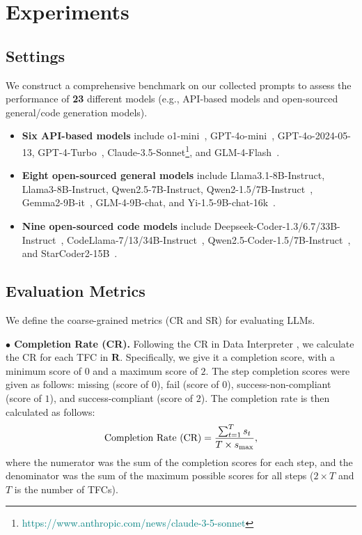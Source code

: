 \section{Experiments}
\label{sec: experiments}

\subsection{Settings}
We construct a comprehensive benchmark on our collected prompts to assess the performance of \textbf{23} different models (e.g., API-based models and open-sourced general/code generation models). 

\begin{itemize}[leftmargin=*,itemsep=0pt,parsep=0.5em,topsep=0.3em,partopsep=0.3em]
    \item \textbf{Six API-based models} include o1-mini~\citep{jaech2024openai}, GPT-4o-mini~\cite{hurst2024gpt4o}, GPT-4o-2024-05-13, GPT-4-Turbo~\citep{achiam2023gpt}, Claude-3.5-Sonnet\footnote{\textcolor{teal}{https://www.anthropic.com/news/claude-3-5-sonnet}}, and GLM-4-Flash~\citep{glm2024chatglm}. 
    \item \textbf{Eight open-sourced general models} include Llama3.1-8B-Instruct, Llama3-8B-Instruct, Qwen2.5-7B-Instruct, Qwen2-1.5/7B-Instruct~\citep{yang2024qwen2}, Gemma2-9B-it~\citep{team2024gemma}, GLM-4-9B-chat, and Yi-1.5-9B-chat-16k~\citep{young2024yi}.
    \item \textbf{Nine open-sourced code models} include Deepseek-Coder-1.3/6.7/33B-Instruct~\citep{guo2024deepseek}, CodeLlama-7/13/34B-Instruct~\citep{roziere2023code}, Qwen2.5-Coder-1.5/7B-Instruct~\citep{hui2024qwen2}, and StarCoder2-15B~\citep{lozhkov2024StarCoder}.
\end{itemize}





\subsection{Evaluation Metrics}
 We define the coarse-grained metrics (CR and SR) for evaluating LLMs.

{\noindent \bf $\bullet$ Completion Rate (CR).} Following the CR in Data Interpreter \citep{hong2024datainterpreter}, we calculate the CR  for each TFC in $\mathbf{R}$.
Specifically, we give it a completion score, with a minimum score of $0$ and a maximum score of $2$. The step completion scores were given as follows: missing (score of $0$), fail (score of $0$), success-non-compliant (score of $1$), and success-compliant (score of $2$). The completion rate is then calculated as follows:
\begin{equation}
    \vspace{-0.1cm}
    \text{Completion Rate (CR)} = \frac{\sum_{t=1}^{T} s_t}{T \times s_{\text{max}}},
    \vspace{-0.1cm}
    \label{eq:completion_rate}
\end{equation}
where the numerator was the sum of the completion scores for each step, and the denominator was the sum of the maximum possible scores for all steps ($2 \times T$ and $T$ is the number of TFCs).

